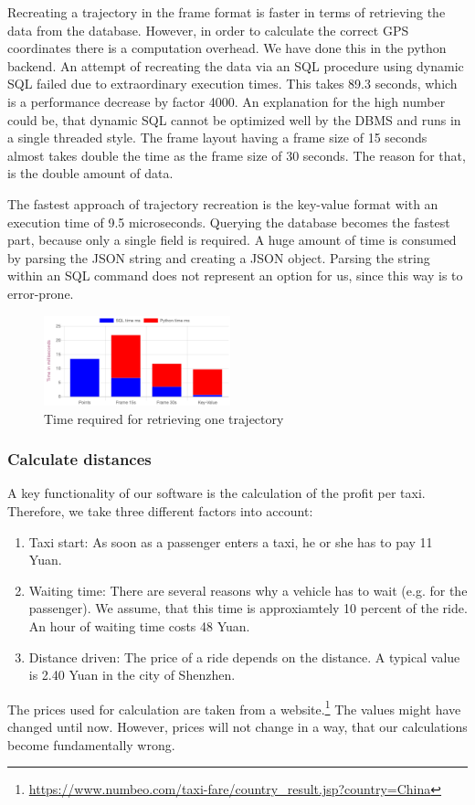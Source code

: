\documentclass[10pt]{sig-alternate}
\begin{document}
Recreating a trajectory in the frame format is faster in terms of retrieving the data from the database. However, in order to calculate the correct GPS coordinates there is a computation overhead. We have done this in the python backend. An attempt of recreating the data via an SQL procedure using dynamic SQL failed due to extraordinary execution times. This takes 89.3 seconds, which is a performance decrease by factor 4000. An explanation for the high number could be, that dynamic SQL cannot be optimized well by the DBMS and runs in a single threaded style. The frame layout having a frame size of 15 seconds almost takes double the time as the frame size of 30 seconds. The reason for that, is the double amount of data.

The fastest approach of trajectory recreation is the key-value format with an execution time of 9.5 microseconds. Querying the database becomes the fastest part, because only a single field is required. A huge amount of time is consumed by parsing the JSON string and creating a JSON object. Parsing the string within an SQL command does not represent an option for us, since this way is to error-prone.

\begin{figure}[ht]
\centering
\includegraphics[width=0.48\textwidth]{img/bench_whole_trajectory.png}
\caption{Time required for retrieving one trajectory}
\label{fig:bench_whole_trajectory}
\end{figure}


\subsubsection{Calculate distances}
A key functionality of our software is the calculation of the profit per taxi. Therefore, we take three different factors into account:
\begin{enumerate}
    \item Taxi start: As soon as a passenger enters a taxi, he or she has to pay 11 Yuan.
    \item Waiting time: There are several reasons why a vehicle has to wait (e.g. for the passenger). We assume, that this time is approxiamtely 10 percent of the ride. An hour of waiting time costs 48 Yuan.
    \item Distance driven: The price of a ride depends on the distance. A typical value is 2.40 Yuan in the city of Shenzhen.
\end{enumerate}
The prices used for calculation are taken from a website.\footnote{\href{https://www.numbeo.com/taxi-fare/country\_result.jsp?country=China}{https://www.numbeo.com/taxi-fare/country\_result.jsp?country=China}} The values might have changed until now. However, prices will not change in a way, that our calculations become fundamentally wrong.
\end{document}
